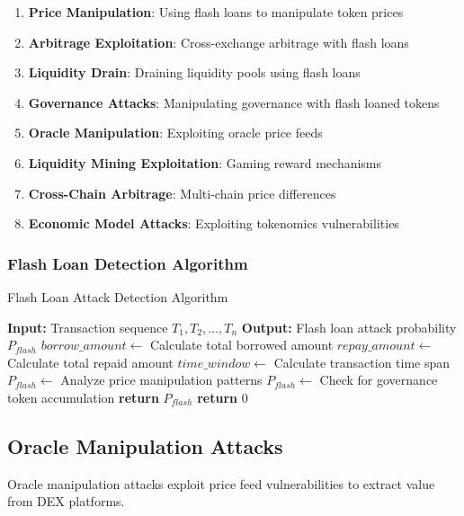 \documentclass[11pt,a4paper]{article}
\begin{document}
\begin{enumerate}
\item \textbf{Price Manipulation}: Using flash loans to manipulate token prices
\item \textbf{Arbitrage Exploitation}: Cross-exchange arbitrage with flash loans
\item \textbf{Liquidity Drain}: Draining liquidity pools using flash loans
\item \textbf{Governance Attacks}: Manipulating governance with flash loaned tokens
\item \textbf{Oracle Manipulation}: Exploiting oracle price feeds
\item \textbf{Liquidity Mining Exploitation}: Gaming reward mechanisms
\item \textbf{Cross-Chain Arbitrage}: Multi-chain price differences
\item \textbf{Economic Model Attacks}: Exploiting tokenomics vulnerabilities
\end{enumerate}

\subsubsection{Flash Loan Detection Algorithm}

\begin{algorithm}
\caption{Flash Loan Attack Detection Algorithm}
\begin{algorithmic}[1]
\STATE \textbf{Input:} Transaction sequence $T_1, T_2, \ldots, T_n$
\STATE \textbf{Output:} Flash loan attack probability $P_{flash}$
\STATE
\STATE $borrow\_amount \leftarrow$ Calculate total borrowed amount
\STATE $repay\_amount \leftarrow$ Calculate total repaid amount
\STATE $time\_window \leftarrow$ Calculate transaction time span
\STATE
{}
    \STATE $P_{flash} \leftarrow$ Analyze price manipulation patterns
    \STATE $P_{flash} \leftarrow$ Check for governance token accumulation
    \STATE \textbf{return} $P_{flash}$
\ELSE
    \STATE \textbf{return} $0$
\ENDIF
\end{algorithmic}
\end{algorithm}

\subsection{Oracle Manipulation Attacks}

Oracle manipulation attacks exploit price feed vulnerabilities to extract value from DEX platforms.
\end{document}
